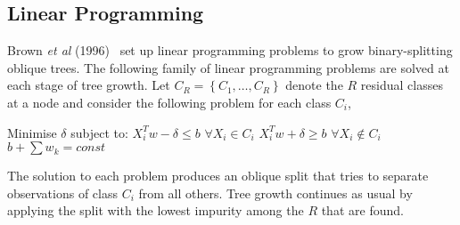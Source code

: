 \subsection{Linear Programming}
\label{LinearProgramming}
Brown \emph{et al} (1996)~\cite{230524} set up linear programming problems to grow binary-splitting oblique trees. The following family of linear programming problems are solved at each stage of tree growth. Let $C_R=\left\{C_1,\ldots,C_R\right\}$ denote the $R$ residual classes at a node and consider the following problem for each class $C_i$,
\begin{algorithmic}
\medskip
\STATE Minimise $\delta$ subject to:
\STATE \hspace{2em} $X_i^Tw-\delta \leq b$ $\forall X_i\in C_i$
\STATE \hspace{2em} $X_i^Tw+\delta \geq b$ $\forall X_i\not\in C_i$
\STATE \hspace{2em} $b +\sum{w_k} = const$
\medskip
\end{algorithmic}
The solution to each problem produces an oblique split that tries to separate observations of class $C_i$ from all others. Tree growth continues as usual by applying the split with the lowest impurity among the $R$ that are found.

\begin{comment}
Setting up these $R$ linear programming problems allows for $R$ interesting obliques splits to be obtained in a very simple manner and it directly obtains splits that separate classes well rather than seeking to minimise the impurity measure over all such splits. An obvious criticism however would be that the case where classes $C_1$ and $C_2$ together are perfectly separated from the rest are not considered when finding oblique splits and so the search for oblique splits is does not provide comprehensive coverage of all possible splits. I would also add to this the fact that no obvious way to extracting concise oblique splits by solving linear programming problems and so trees grown by this method may not be as interpretable as would be hoped.
\end{comment}

\begin{comment}
\subsection{Global Tree Optimisation SVM}
\label{GlobalTreeOptimisationSVM}
Bennett \emph{et al} use support vector machines (SVM) in GTO/SVM (Global Tree Optimisation SVM) (1997)~\cite{bennett97support}. The focus of their work focuses more on improving the predictive power of trees that have already been grown by maximising the margin between the oblique splits used and the observations in the training set. Once a tree structure is known, their article illustrates how all sequential SVM problems can be combined and solved simultaneously so that the entire tree can be regrown in one go while moving existing oblique splits away from observations.
\end{comment}

